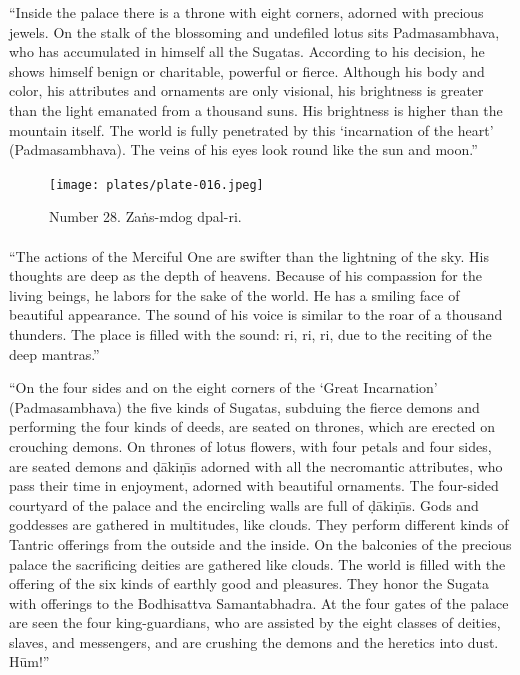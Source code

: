 \documentclass[a4paper, 12pt, oneside]{article}
\begin{document}
``Inside the palace there is a throne with eight corners, adorned with  precious jewels. On the stalk of the blossoming and undefiled lotus sits Padmasambhava, who has accumulated in himself all the Sugatas. According to his decision, he shows himself benign or charitable, powerful or fierce. Although his body and color, his attributes and ornaments are only visional, his brightness is greater than the light emanated from a thousand suns. His brightness is higher than the mountain itself. The world is fully penetrated by this `incarnation of the heart' (Padmasambhava). The veins of his eyes look round like the sun and moon.''

\clearpage
\vspace*{\fill}
\begin{figure}[H]
\centering
\texttt{[image: plates/plate-016.jpeg]}
\caption*{Number 28. Za\.{n}s-mdog dpal-ri.}
\end{figure}
\vspace*{\fill}
\clearpage
\paragraph{}
``The actions of the Merciful One are swifter than the lightning of the sky. His thoughts are deep as the depth of heavens. Because of his compassion for the living beings, he labors for the sake of the world. He has a smiling face of beautiful appearance. The sound of his voice is similar to the roar of a thousand thunders. The place is filled with the sound: ri, ri, ri, due to the reciting of the deep mantras.''

``On the four sides and on the eight corners of the `Great Incarnation' (Padmasambhava) the five kinds of Sugatas, subduing the fierce demons and performing the four kinds of deeds, are seated on thrones, which are erected on crouching demons. On thrones of lotus flowers, with four petals and four sides, are seated demons and \d{d}\={a}ki\d{n}\={\i}s adorned with all the necromantic attributes, who pass their time in enjoyment, adorned with beautiful ornaments. The four-sided courtyard of the palace and the encircling walls are full of \d{d}\={a}ki\d{n}\={\i}s. Gods and goddesses are gathered in multitudes, like clouds. They perform different kinds of Tantric offerings from the outside and the inside. On the balconies of the precious palace the sacrificing deities are gathered like clouds. The world is filled with the offering of the six kinds of earthly good and pleasures. They honor the Sugata with offerings to the Bodhisattva Samantabhadra. At the four gates of the palace are seen the four king-guardians, who are assisted by the eight classes of deities, slaves, and messengers, and are crushing the demons and the heretics into dust. H\={u}m!''
\end{document}
